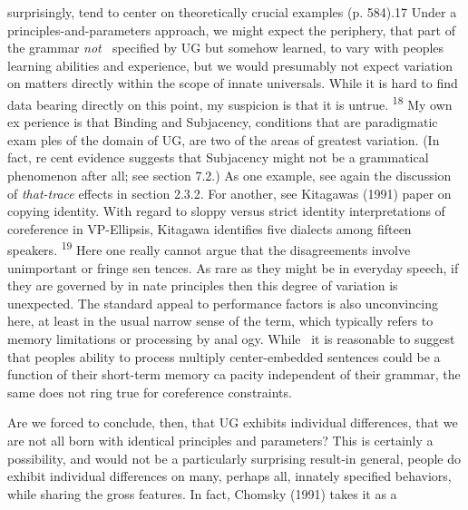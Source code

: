\clearpage\setcounter{page}{1}\begin{styleStandard}
surprisingly, tend to center on theoretically crucial examples{\textquotedbl} (p. 584).17 Under a principles-and-parameters approach, we might expect the periphery, that part of the grammar \textit{not \ }specified by UG but somehow learned, to vary with people{\textquotesingle}s learning abilities and experience, but we would presumably not expect variation on matters directly within the scope of innate universals. While it is hard to find data bearing directly on this point, my suspicion is that it is untrue. \textsuperscript{18}\textsuperscript{ }My own ex\- perience is that Binding and Subjacency, conditions that are paradigmatic exam\- ples of the domain of UG, are two of the areas of greatest variation. (In fact, re\- cent evidence suggests that Subjacency might not be a grammatical phenomenon after all; see section 7.2.) As one example, see again the discussion of \textit{that-trace }effects in section 2.3.2. For another, see Kitagawa{\textquotesingle}s (1991) paper on copying identity. With regard to sloppy versus strict identity interpretations of coreference in VP-Ellipsis, Kitagawa identifies five {\textquotedbl}dialects{\textquotedbl} among fifteen speakers. \textsuperscript{19}\textsuperscript{ }Here one really cannot argue that the disagreements involve unimportant or fringe sen\- tences. As rare as they might be in everyday speech, if they are governed by in\- nate principles then this degree of variation is unexpected. The standard appeal to performance factors is also unconvincing here, at least in the usual narrow sense of the term, which typically refers to memory limitations or processing by anal\- ogy. While \ it is reasonable to suggest that people{\textquotesingle}s ability to process multiply center-embedded sentences could be a function of their short-term memory ca\- pacity independent of their grammar, the same does not ring true for coreference constraints.
\end{styleStandard}


\begin{styleStandard}
Are we forced to conclude, then, that UG exhibits individual differences, that we are not all born with identical principles and parameters? This is certainly a possibility, and would not be a particularly surprising result-in general, people do exhibit individual differences on many, perhaps all, innately specified behaviors, while sharing the gross features. In fact, Chomsky (1991) takes it as a
\end{styleStandard}


